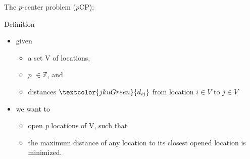 \documentclass[utf8,aspectratio=1610,ngerman,english]{beamer}
\renewcommand{\emph}[1]{\textcolor{jkuGreen}{#1}}
\newcommand{\pCP}{($p$CP)\xspace}
\newcommand{\npCP}{(n-$p$CP)\xspace}
\begin{document}
\begin{frame}{The $p$-center problem \pCP:}
    \begin{block}{Definition}
        \begin{itemize}\pause
            \item given
                  \begin{itemize}
                      \item a set V of locations, \pause
                      \item \emph{$p$} $\in \mathbb{Z}$, and \pause
                      \item \emph{distances} $\emph{d_{ij}}$ from location $i \in V$ to $j \in V$ \pause
                  \end{itemize}
            \item we want to
                  \begin{itemize}
                      \item \emph{open \textit{p} locations} of V, such that \pause
                      \item the \emph{maximum distance} of any location to its closest opened location is \emph{minimized}.
                  \end{itemize}
        \end{itemize}
    \end{block}
    \citet{Hakimi1964,Elloumi2018,contardo2019scalable,GAAR2022}
\end{frame}
\end{document}
